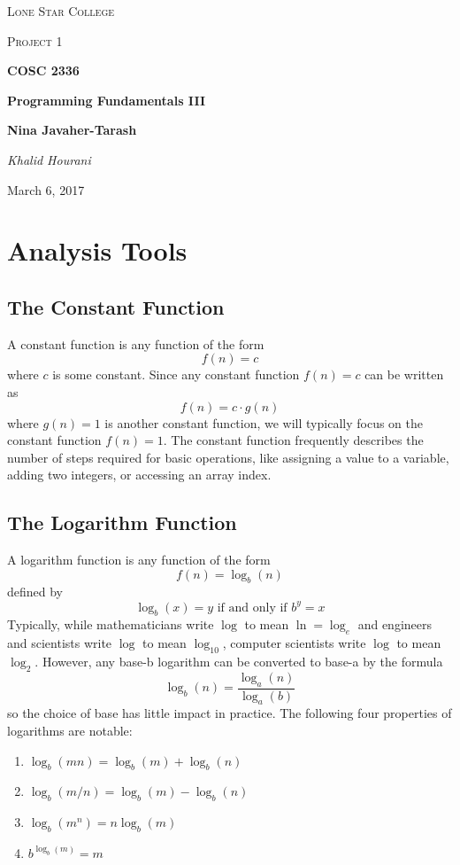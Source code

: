 \documentclass[a4paper]{article}
\begin{document}
\begin{titlepage}
	\centering
	{\scshape\LARGE Lone Star College \par}
	\vspace{1cm}
	{\scshape\Large Project 1\par}
	\vspace{1.5cm}
	{\huge\bfseries COSC 2336 \par}
	{\huge\bfseries Programming Fundamentals III\par}
	\vspace{0.5cm}
	{\large\bfseries Nina Javaher-Tarash\par}
	\vspace{2cm}
	{\Large\itshape Khalid Hourani\par}
	\vspace{0.5cm}
	{\large March 6, 2017\par}
	\vfill

\end{titlepage}
\clearpage\mbox{}\thispagestyle{empty}\clearpage
\section{Analysis Tools}
\subsection{The Constant Function}
A constant function is any function of the form \[f(n) = c\] where $c$ is some constant. Since any constant function $f(n) = c$ can be written as \[f(n) = c \cdot g(n)\] where $g(n) = 1$ is another constant function, we will typically focus on the constant function $f(n)=1$. The constant function frequently describes the number of steps required for basic operations, like assigning a value to a variable, adding two integers, or accessing an array index. 

\subsection{The Logarithm Function}

  A logarithm function is any function of the form \[f(n)=\log_b(n)\] defined by \[\log_b(x)=y\text{ if and only if } b^y=x\] Typically, while mathematicians write $\log$ to mean $\ln=\log_e$ and engineers and scientists write $\log$ to mean $\log_{10}$, computer scientists write $\log$ to mean $\log_2$. However, any base-b logarithm can be converted to base-a by the formula \[\log_b(n)=\frac{\log_a(n)}{\log_a(b)}\] so the choice of base has little impact in practice. The following four properties of logarithms are notable:
  \begin{enumerate}
  \item $\log_b(mn) = \log_b(m)+\log_b(n)$
  \item $\log_b(m/n) = \log_b(m) - \log_b(n)$
  \item $\log_b(m^n) = n\log_b(m)$
  \item $b^{\log_b(m)} = m$
  \end{enumerate}
\end{document}
